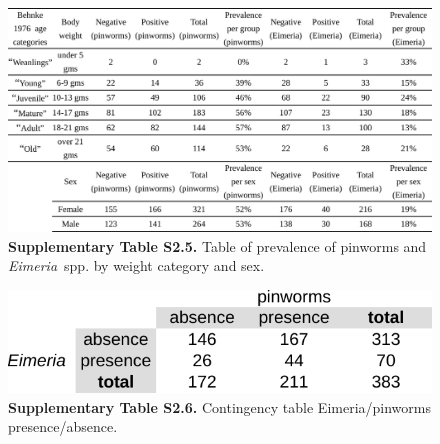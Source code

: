 \begin{figure}[H]
	\centering
	\includegraphics[width=\linewidth,height=\textheight,keepaspectratio]{images/2article1/SupplementaryTableS5.pdf}
	\captionsetup{labelformat=empty}
	\caption{\textbf{Supplementary Table S2.5.} Table of prevalence of pinworms and \textit{Eimeria}~spp. by weight category and sex.}
\end{figure}

\vspace{2cm}

\begin{figure}[H]
	\centering
	\includegraphics[width=0.6\linewidth,height=\textheight,keepaspectratio]{images/2article1/SupplementaryTableS6.pdf}
	\captionsetup{labelformat=empty}
	\caption{\textbf{Supplementary Table S2.6.}  Contingency table Eimeria/pinworms presence/absence.}
\end{figure}

\newpage

